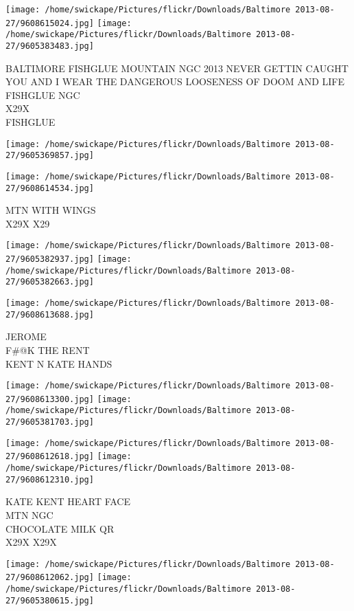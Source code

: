\documentclass[10pt,letterpaper]{article}
\begin{document}
\texttt{[image: /home/swickape/Pictures/flickr/Downloads/Baltimore 2013-08-27/9608615024.jpg]}
\texttt{[image: /home/swickape/Pictures/flickr/Downloads/Baltimore 2013-08-27/9605383483.jpg]}

BALTIMORE FISHGLUE MOUNTAIN NGC 2013 NEVER GETTIN CAUGHT\\
YOU AND I WEAR THE DANGEROUS LOOSENESS OF DOOM AND LIFE FISHGLUE NGC\\
X29X\\
FISHGLUE
\pagebreak

\texttt{[image: /home/swickape/Pictures/flickr/Downloads/Baltimore 2013-08-27/9605369857.jpg]}

\vspace{0.25in}
\texttt{[image: /home/swickape/Pictures/flickr/Downloads/Baltimore 2013-08-27/9608614534.jpg]}

MTN WITH WINGS\\
X29X X29
\pagebreak

\texttt{[image: /home/swickape/Pictures/flickr/Downloads/Baltimore 2013-08-27/9605382937.jpg]}
\texttt{[image: /home/swickape/Pictures/flickr/Downloads/Baltimore 2013-08-27/9605382663.jpg]}

\vspace{0.25in}
\texttt{[image: /home/swickape/Pictures/flickr/Downloads/Baltimore 2013-08-27/9608613688.jpg]}

JEROME\\
F\#@K THE RENT\\
KENT N KATE HANDS
\pagebreak

\texttt{[image: /home/swickape/Pictures/flickr/Downloads/Baltimore 2013-08-27/9608613300.jpg]}
\texttt{[image: /home/swickape/Pictures/flickr/Downloads/Baltimore 2013-08-27/9605381703.jpg]}

\texttt{[image: /home/swickape/Pictures/flickr/Downloads/Baltimore 2013-08-27/9608612618.jpg]}
\texttt{[image: /home/swickape/Pictures/flickr/Downloads/Baltimore 2013-08-27/9608612310.jpg]}

KATE KENT HEART FACE\\
MTN NGC\\
CHOCOLATE MILK QR\\
X29X X29X
\pagebreak

\texttt{[image: /home/swickape/Pictures/flickr/Downloads/Baltimore 2013-08-27/9608612062.jpg]}
\texttt{[image: /home/swickape/Pictures/flickr/Downloads/Baltimore 2013-08-27/9605380615.jpg]}
\end{document}
